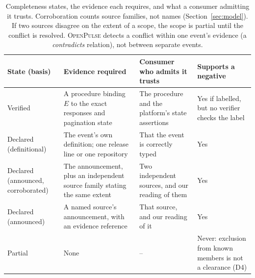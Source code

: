 \documentclass[11pt,a4paper]{article}
\newcommand{\op}{\textsc{OpenPulse}}
\begin{document}
\begin{table}[t]
\centering
\footnotesize
\begin{tabularx}{\linewidth}{@{}>{\raggedright\arraybackslash}p{2.3cm} >{\raggedright\arraybackslash}X >{\raggedright\arraybackslash}X >{\raggedright\arraybackslash}p{2.1cm}@{}}
\toprule
State (basis) & Evidence required & Consumer who admits it trusts & Supports a negative \\
\midrule
Verified & A procedure binding $E$ to the exact responses and
  pagination state & The procedure and the platform's state assertions
  & Yes if labelled, but no verifier checks the label \\
Declared (definitional) & The event's own definition; one release
  line or one repository & That the event is correctly typed & Yes \\
Declared (announced, corroborated) & The announcement, plus an
  independent source family stating the same extent & Two independent
  sources, and our reading of them & Yes \\
Declared (announced) & A named source's announcement, with an
  evidence reference & That source, and our reading of it & Yes \\
Partial & None & -- & Never: exclusion from known members is not a
  clearance (D4) \\
\bottomrule
\end{tabularx}
\caption{Completeness states, the evidence each requires, and what a
consumer admitting it trusts. Corroboration counts source families,
not names (Section~\ref{sec:model}). If two sources disagree on the
extent of a scope, the scope is partial until the conflict is resolved.
\op{} detects a conflict within one event's evidence (a
\emph{contradicts} relation), not between separate events.}
\label{tab:policies}
\end{table}
\end{document}
